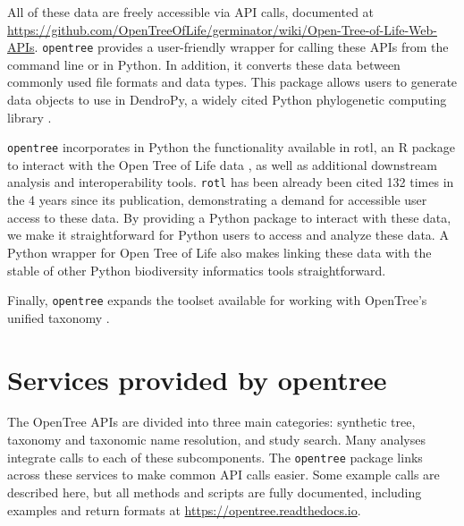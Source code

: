 \documentclass[oupdraft]{sysbio_sse}
\begin{document}
All of these data are freely accessible via API calls, documented at \url{https://github.com/OpenTreeOfLife/germinator/wiki/Open-Tree-of-Life-Web-APIs}.
\texttt{opentree} provides a user-friendly wrapper for calling these APIs from the command line or in Python.
In addition, it converts these data between commonly used file formats and data types.
This package allows users to generate data objects to use in DendroPy, a widely cited Python phylogenetic computing library \citep{sukumaran_dendropy_2010}.


\texttt{opentree} incorporates in Python the functionality available in rotl, an {R} package to interact with the Open Tree of Life data \citep{michonneau_rotl_2016}, as well as additional downstream analysis and interoperability tools.
\texttt{rotl} has been already been cited 132 times in the 4 years since its publication, demonstrating a demand for accessible user access to these data.
By providing a Python package to interact with these data, we make it straightforward for Python users to access and analyze these data.
A Python wrapper for Open Tree of Life also makes linking these data with the stable of other Python biodiversity informatics tools straightforward.

Finally, \texttt{opentree} expands the toolset available for working with OpenTree's unified taxonomy \citep{rees_automated_2017}.


\bigskip
\section{Services provided by opentree}
\label{sec3}


The OpenTree APIs are divided into three main categories: synthetic tree, taxonomy and taxonomic name resolution, and study search.
Many analyses integrate calls to each of these subcomponents.
The \texttt{opentree} package links across these services to make common API calls easier.
Some example calls are described here, but all methods and scripts are fully documented, including examples and return formats at \url{https://opentree.readthedocs.io}.
\end{document}
